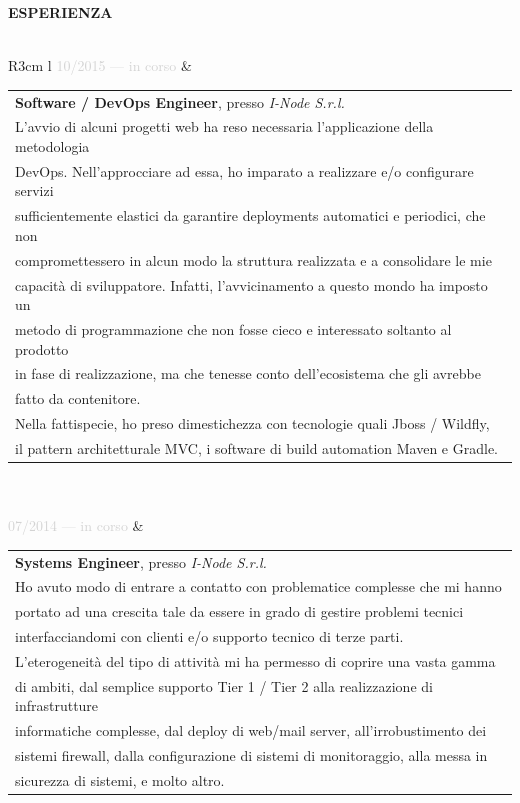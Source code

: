 \documentclass{article}
\begin{document}
\textbf{\textcolor{deepblue}{ESPERIENZA}} \\\\ \hfill
\begin{tabular}{ R{3cm} l }
	\textcolor{lightgray}{10/2015 — in corso} & \begin{tabular}[l]{@{}l@{}}
	\textbf{Software / DevOps Engineer}, presso \textit{I-Node S.r.l.} \\
	L'avvio di alcuni progetti web ha reso necessaria l'applicazione della metodologia \\
	DevOps. Nell'approcciare ad essa, ho imparato a realizzare e/o configurare servizi \\
	sufficientemente elastici da garantire deployments automatici e periodici, che non \\
	compromettessero in alcun modo la struttura realizzata e a consolidare le mie \\
	capacità di sviluppatore. Infatti, l'avvicinamento a questo mondo ha imposto un \\
	metodo di programmazione che non fosse cieco e interessato soltanto al prodotto \\
	in fase di realizzazione, ma che tenesse conto dell'ecosistema che gli avrebbe \\
	fatto da contenitore. \\
	Nella fattispecie, ho preso dimestichezza con tecnologie quali Jboss / Wildfly, \\
	il pattern architetturale MVC, i software di build automation Maven e Gradle.
\end{tabular} \\\\ \hfill
\textcolor{lightgray}{07/2014 — in corso}   & \begin{tabular}[l]{@{}l@{}}
\textbf{Systems Engineer}, presso \textit{I-Node S.r.l.} \\
Ho avuto modo di entrare a contatto con problematice complesse che mi hanno \\
portato ad una crescita tale da essere in grado di gestire problemi tecnici \\
interfacciandomi con clienti e/o supporto tecnico di terze parti. \\
L'eterogeneità del tipo di attivit\`a mi ha permesso di coprire una vasta gamma \\
di ambiti, dal semplice supporto Tier 1 / Tier 2 alla realizzazione di infrastrutture \\
informatiche complesse, dal deploy di web/mail server, all'irrobustimento dei \\
sistemi firewall, dalla configurazione di sistemi di monitoraggio, alla messa in \\
sicurezza di sistemi, e molto altro.
\end{tabular} \\\\ \hfill
\end{tabular}
\end{document}
